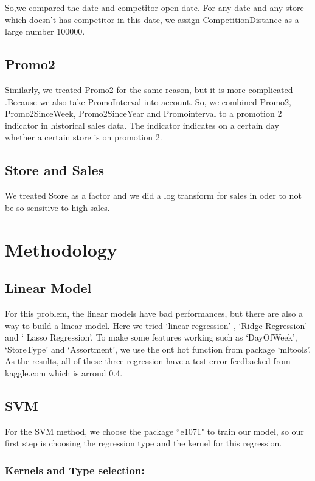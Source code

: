 \documentclass[12pt]{article}
\begin{document}
So,we compared the date and competitor open date. For any date and any store which doesn’t has competitor in this date, we assign CompetitionDistance as a large number 100000.

\subsection{Promo2}
Similarly, we treated Promo2 for the same reason, but it is more complicated .Because we also take PromoInterval into account. So, we combined Promo2, Promo2SinceWeek, Promo2SinceYear and Promointerval to a promotion 2
indicator in historical sales data. The indicator indicates on a certain day whether a certain store is on promotion 2.

\subsection{Store and Sales}
We treated Store as a factor and we did a log transform for sales in oder to not be so sensitive to high sales.

\section{\textbf{Methodology}}

\subsection{Linear Model}

For this problem, the linear models have bad performances, but there are also a way to build a linear model. Here we tried `linear regression' , `Ridge Regression' and ` Lasso Regression'. To make some features working such as `DayOfWeek', `StoreType' and `Assortment', we use the ont hot function from package `mltools'. As the results,  all of these three regression have a test error feedbacked from kaggle.com which is arroud 0.4. 

\subsection{\textbf{SVM}}

	For the SVM method, we choose the package ``e1071" to train our model, so our first step is choosing the regression type and the kernel for this regression. 

	\subsubsection{Kernels and Type selection:}
\end{document}
